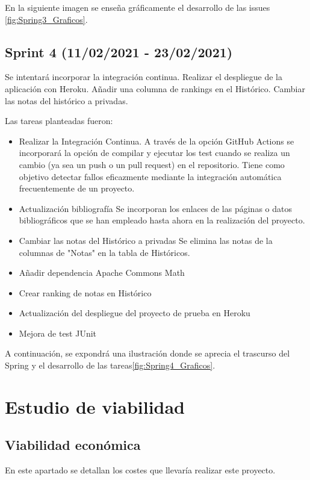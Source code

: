 En la siguiente imagen se enseña gráficamente el desarrollo de las issues \ref{fig:Spring3_Graficos}.


\subsection{Sprint 4 (11/02/2021 - 23/02/2021)}
Se intentará incorporar la integración continua. Realizar el despliegue de la aplicación con Heroku. Añadir una columna de rankings en el Histórico. Cambiar las notas del histórico a privadas.

Las tareas planteadas fueron:
\begin{itemize}
	\tightlist
	\item Realizar la Integración Continua.
	A través de la opción GitHub Actions se incorporará la opción de compilar y ejecutar los test cuando se realiza un cambio (ya sea un push o un pull request) en el repositorio. Tiene como objetivo detectar fallos eficazmente mediante la integración automática frecuentemente de un proyecto. 
	\item Actualización bibliografía
	Se incorporan los enlaces de las páginas o datos bibliográficos que se han empleado hasta ahora en la realización del proyecto.
	\item Cambiar las notas del Histórico a privadas
	Se elimina las notas de la columnas de "Notas" en la tabla de Históricos. 
	\item Añadir dependencia Apache Commons Math
	\item Crear ranking de notas en Histórico
	\item Actualización del despliegue del proyecto de prueba en Heroku 
	\item Mejora de test JUnit
	
\end{itemize}

A continuación, se expondrá una ilustración donde se aprecia el trascurso del Spring y el desarrollo de las tareas\ref{fig:Spring4_Graficos}.


\section{Estudio de viabilidad}
\subsection{Viabilidad económica}
En este apartado se detallan los costes que llevaría realizar este proyecto.

